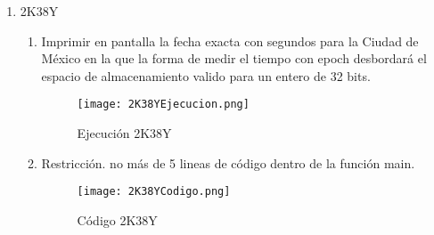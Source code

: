 \documentclass[a4paperx]{article}
\begin{document}
\begin{enumerate}
\begin{enumerate}
\begin{figure}[H]
\centering
\texttt{[image: MatricesMalloc.png]}
\caption{C\'odigo Matrices Multiplicaci\'on}
\end{figure}

\item{Las dimensiones de las matrices deber\'an ser especificadas por el
usuario, y no se debe emplear mas espacio de almacenamiento que el
requerido por las matrices.}\\

\begin{figure}[H]
\centering
\texttt{[image: MatricesDimension.png]}
\caption{C\'odigo Matrices Multiplicaci\'on}
\end{figure}

\item{Se tiene la opci\'on de solicitar los elementos de las matrices al usuario o generarlos de manera automatica a trav\'es de funciones de generaci\'on de numeros aleatorios propias de C. En ambos casos de deben imprimir las matrices y el resultado de la multiplicaci \'on.}\\

\begin{figure}[H]
\centering
\texttt{[image: EjecucionMatrices.png]}
\caption{C\'odigo Matrices Multiplicaci\'on}
\end{figure}

\end{enumerate}

\item{2K38Y}

\begin{enumerate}

\item{Imprimir en pantalla la fecha exacta con segundos para la Ciudad de
M\'exico en la que la forma de medir el tiempo con epoch desbordar\'a
el espacio de almacenamiento valido para un entero de 32 bits.}\\

\begin{figure}[H]
\centering
\texttt{[image: 2K38YEjecucion.png]}
\caption{Ejecuci\'on 2K38Y }
\end{figure}

\item{Restricci\'on. no m\'as de 5 lineas de c\'odigo dentro de la funci\'on main.}\\

\begin{figure}[H]
\centering
\texttt{[image: 2K38YCodigo.png]}
\caption{C\'odigo 2K38Y }
\end{figure}

\end{enumerate}

\end{enumerate}
\end{document}
